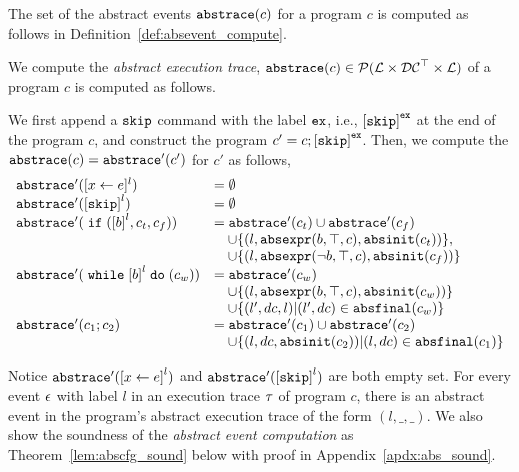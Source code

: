 The set of the abstract events $\mathtt{abs}{\mathtt{trace}}(c)$ for a program $c$
is computed as follows in Definition~\ref{def:absevent_compute}.
 \begin{defn}
 \label{def:psRB-absevent_compute}
 We compute the \emph{abstract execution trace}, $\mathtt{abs}{\mathtt{trace}}(c) \in \mathcal{P}( \mathcal{L} \times \mathcal{DC}^{\top} \times \mathcal{L} )$ of a program $c$ is computed as follows.

 We first append a $\mathtt{skip}$ command with 
the label $\mathtt{ex}$, i.e., $\clabel{\eskip}^{{\lex}}$ at the end of the program $c$, and construct 
the program $c' = c;\clabel{\eskip}^{{\lex}}$.
Then, we compute the $\mathtt{abs}{\mathtt{trace}}(c) = \mathtt{abs}{\mathtt{trace}}'(c')$ for $c'$ as follows,
 {
 \[
 \begin{array}{ll}
 \absflow'(\clabel{\assign{x}{\expr}}{}^l) & = \emptyset \\
 \absflow'(\clabel{\eskip}^{l}) & = \emptyset \\
 \absflow'(\eif (\clabel{\bexpr}^l, c_t, c_f)) & = \absflow'(c_t) \cup \absflow'(c_f)
 \\ & \quad 
 \cup \left \{(l, \absexpr(\bexpr, \top, c), \absinit(c_t) ) \right \} , 
 \\ & \quad 
 \cup \left \{ (l, \absexpr(\neg\bexpr, \top, c), \absinit(c_f)) \right \} \\
 \absflow'(\ewhile \clabel{\bexpr}^l \edo (c_w)) & = \absflow'(c_w) 
 \\ & \quad 
 \cup \{(l, \absexpr(\bexpr, \top, c), \absinit(c_w)) \} 
 \\ & \quad 
 \cup \{(l', dc, l)| (l', dc) \in \absfinal(c_w) \} \\
 \absflow'(c_1 ; c_2) & = \absflow'(c_1) \cup \absflow'(c_2) 
 \\ & \quad 
 \cup \{ (l, dc, \absinit(c_2)) | (l, dc) \in \absfinal(c_1) \} \\
 \end{array}
 \]
 }
 \end{defn}
 Notice $\absflow'(\clabel{\assign{x}{\expr}}^{l})$ and $\absflow'(\clabel{\eskip}^{l})$ are both empty set. 
 For every event $\mathtt{\epsilon}$ with label $l$ in an execution trace $\mathtt{\tau}$ of program $c$, 
 there is an abstract event in the program's abstract execution trace of the form $(l, \_, \_)$. 
 We also show the soundness of the \emph{abstract event computation} as Theorem~\ref{lem:abscfg_sound} below with proof in Appendix~\ref{apdx:abs_sound}.
